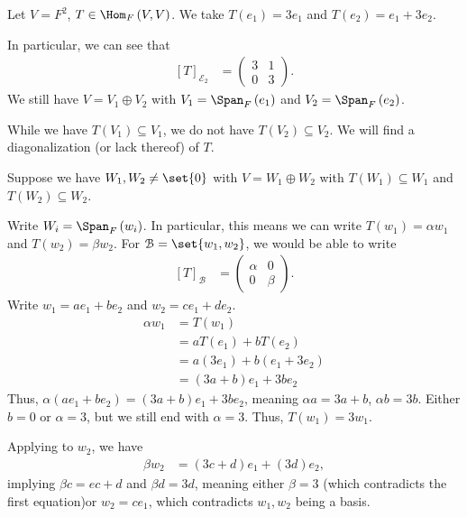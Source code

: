 \documentclass[10pt]{mypackage}
\begin{document}
\begin{example}
  Let $V = F^2$, $T \in \Hom_{F}\left(V,V\right)$. We take $T\left(e_1\right) = 3e_1$ and $T\left(e_2\right) = e_1 + 3e_2$.\newline

  In particular, we can see that
  \begin{align*}
    \left[T\right]_{\mathcal{E}_2} &= \begin{pmatrix}3 & 1 \\ 0 & 3\end{pmatrix}.
  \end{align*}
  We still have $V = V_1\oplus V_2$ with $V_1 = \Span_{F}\left(e_1\right)$ and $V_2 = \Span_{F}\left(e_2\right)$.\newline

  While we have $T\left(V_1\right)\subseteq V_1$, we do not have $T\left(V_2\right)\subseteq V_2$. We will find a diagonalization (or lack thereof) of $T$.\newline

  Suppose we have $W_1,W_2\neq \set{0}$ with $V = W_1 \oplus W_2$ with $T\left(W_1\right)\subseteq W_1$ and $T\left(W_2\right)\subseteq W_2$.\newline

  Write $W_i = \Span_{F}\left(w_i\right)$. In particular, this means we can write $T\left(w_1\right) = \alpha w_1$ and $T\left(w_2\right) = \beta w_2$. For $\mathcal{B} = \set{w_1,w_2}$, we would be able to write
  \begin{align*}
    \left[T\right]_{\mathcal{B}} &= \begin{pmatrix}\alpha & 0 \\ 0 & \beta\end{pmatrix}.
  \end{align*}
  Write $w_1 = ae_1 + be_2$ and $w_2 = ce_1 + de_2$.
  \begin{align*}
    \alpha w_1 &= T\left(w_1\right)\\
               &= aT\left(e_1\right) + bT\left(e_2\right)\\
               &= a\left(3e_1\right) + b\left(e_1 + 3e_2\right)\\
               &= \left(3a+b\right)e_1 + 3be_2
  \end{align*}
  Thus, $\alpha\left(ae_1 + be_2\right) = \left(3a+b\right)e_1 + 3be_2$, meaning $\alpha a = 3a + b$, $\alpha b = 3b$. Either $b = 0$ or $\alpha = 3$, but we still end with $\alpha = 3$. Thus, $T\left(w_1\right) = 3w_1$.\newline

  Applying to $w_2$, we have
  \begin{align*}
    \beta w_2 &= \left(3c + d\right)e_1 + \left(3d\right)e_2,
  \end{align*}
  implying $\beta c = ec + d$ and $\beta d = 3d$, meaning either $\beta = 3$ (which contradicts the first equation)or $w_2 = ce_1$, which contradicts $w_1,w_2$ being a basis.
\end{example}
\end{document}
